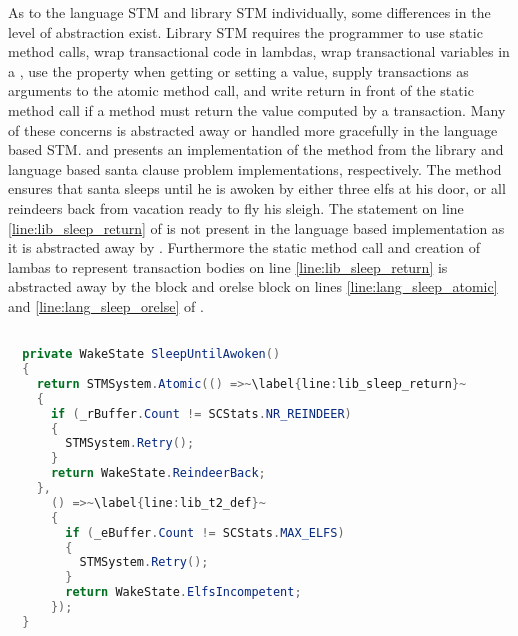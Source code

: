 As to the language \ac{STM} and library \ac{STM} individually, some differences in the level of abstraction exist. Library \ac{STM} requires the programmer to use static method calls, wrap transactional code in lambdas, wrap transactional variables in a , use the  property when getting or setting a value, supply  transactions as arguments to the atomic method call, and write return in front of the static method call if a method must return the value computed by a transaction. Many of these concerns is abstracted away or handled more gracefully in the language based \ac{STM}.  and  presents an implementation of the  method from the library and language based santa clause problem implementations, respectively. The method ensures that santa sleeps until he is awoken by either three elfs at his door, or all reindeers back from vacation ready to fly his sleigh. The  statement on line \ref{line:lib_sleep_return} of  is not present in the language based implementation as it is abstracted away by \stmnamesp. Furthermore the static method call and creation of lambas to represent transaction bodies on line \ref{line:lib_sleep_return} is abstracted away by the  block and orelse block on lines \ref{line:lang_sleep_atomic} and \ref{line:lang_sleep_orelse} of .

\begin{lstlisting}[label=lst:lib_SleepUntilAwoken,
  caption={\bscode{SleepUntilAwoken} Method - \ac{STM} Library},
  language=Java,  
  showspaces=false,
  showtabs=false,
  breaklines=true,
  showstringspaces=false,
  breakatwhitespace=true,
  escapechar=~,
  commentstyle=\color{greencomments},
  keywordstyle=\color{bluekeywords},
  stringstyle=\color{redstrings},
  morekeywords={atomic, retry, orelse, var, get, set, ref, out}]  % Start your code-block

  private WakeState SleepUntilAwoken()
  {
    return STMSystem.Atomic(() =>~\label{line:lib_sleep_return}~
    {
      if (_rBuffer.Count != SCStats.NR_REINDEER)
      {
        STMSystem.Retry();
      }
      return WakeState.ReindeerBack;
    },
      () =>~\label{line:lib_t2_def}~
      {
        if (_eBuffer.Count != SCStats.MAX_ELFS)
        {
          STMSystem.Retry();
        }
        return WakeState.ElfsIncompetent;
      });
  }
\end{lstlisting}

